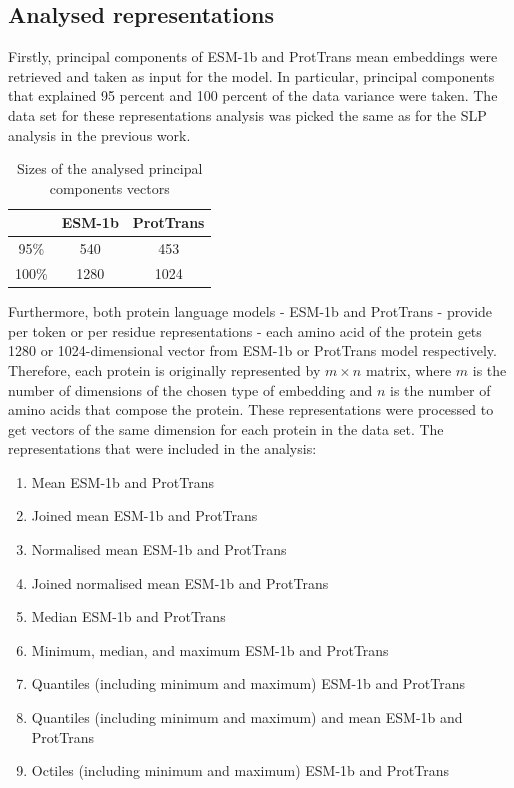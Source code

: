 \documentclass[12pt]{article}
\begin{document}
	\newpage

	\subsection{Analysed representations}
	\label{analysedRepresentations}

	Firstly, principal components of ESM-1b and ProtTrans
	mean embeddings were retrieved and taken as input for the 
	model. In particular, principal components that explained 
	95 percent and 100 percent of the data variance were taken.
	The data set for these representations analysis was picked 
	the same as for the SLP analysis in the previous work.

	\begin{table}[h!]
		\caption{Sizes of the analysed principal components 
		vectors}
		\vspace{0.2cm}
		\centering
		\begin{tabular}{ | c | c c | }
			\hline 
			 & ESM-1b & ProtTrans \\
			\hline 
			95\% & 540 & 453 \\
			100\% & 1280 & 1024 \\
			\hline    
		\end{tabular}
		\label{table:vectorsPCADimensions}
	\end{table}
	
	Furthermore, both protein language models - ESM-1b and 
	ProtTrans - provide 
	per token or per residue representations - each 
	amino acid of the protein gets 1280 or 1024-dimensional vector from
	ESM-1b or ProtTrans model respectively. Therefore, each protein is 
	originally represented by ${m \times n}$ matrix, 
	where ${m}$ is the number of dimensions of the chosen type of embedding
	and ${n}$ is the number of amino acids that compose the protein. 
	These representations were processed to get vectors of the same dimension 
	for each protein in the data set. The representations 
	that were included in the analysis:

	\begin{enumerate}
		\item Mean ESM-1b and ProtTrans 
		\item Joined mean ESM-1b and ProtTrans
		\item Normalised mean ESM-1b and ProtTrans
		\item Joined normalised mean ESM-1b and ProtTrans
		\item Median ESM-1b and ProtTrans
		\item Minimum, median, and maximum ESM-1b and ProtTrans
		\item Quantiles (including minimum and maximum) ESM-1b and ProtTrans
		\item Quantiles (including minimum and maximum) and mean ESM-1b and ProtTrans
		\item Octiles (including minimum and maximum) ESM-1b and ProtTrans
	\end{enumerate}
\end{document}
